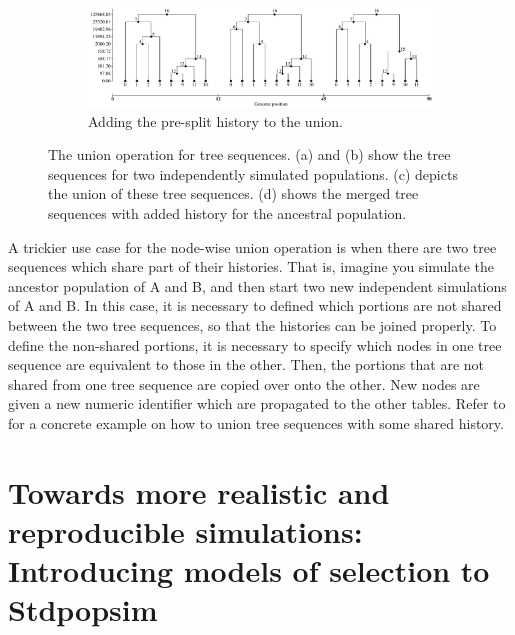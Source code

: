 \begin{figure}
\begin{subfigure}[b]{0.9\textwidth}
\includegraphics[width=\linewidth]{union_example/tsu_recap.pdf}
\caption{Adding the pre-split history to the union.}\label{fig:tsu_recap}
\end{subfigure}

\caption[The union operation for tree sequences]{The union operation for tree sequences.
(a) and (b) show the tree sequences for two independently simulated populations.
(c) depicts the union of these tree sequences.
(d) shows the merged tree sequences with added history for the ancestral population.}
\label{fig:union_op}
\end{figure}

A trickier use case for the node-wise union operation is when there are two tree sequences which share part of their histories.
That is, imagine you simulate the ancestor population of A and B, and then start two new independent simulations of A and B.
In this case, it is necessary to defined which portions are not shared between the two tree sequences,
so that the histories can be joined properly.
To define the non-shared portions, it is necessary to specify which nodes in one tree sequence are equivalent to those in the other.
Then, the portions that are not shared from one tree sequence are copied over onto the other.
New nodes are given a new numeric identifier which are propagated to the other tables.
Refer to \citet{rodrigues_vignette_2021} for a concrete example on how to union tree sequences with some shared history.

\section{Towards more realistic and reproducible simulations: Introducing models of selection to Stdpopsim}

